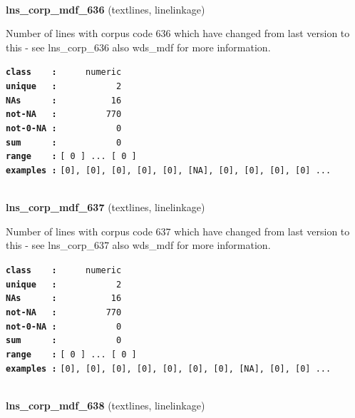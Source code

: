 \documentclass[]{article}
\begin{document}
~

\textbf{lns\_corp\_mdf\_636} (textlines, linelinkage)

Number of lines with corpus code 636 which have changed from last
version to this - see lns\_corp\_636 also wds\_mdf for more information.

\textbf{\texttt{class\ \ \ \ :}} \texttt{~~~~~numeric}\\
\textbf{\texttt{unique\ \ \ :}} \texttt{~~~~~~~~~~~2}\\
\textbf{\texttt{NAs\ \ \ \ \ \ :}} \texttt{~~~~~~~~~~16}\\
\textbf{\texttt{not-NA\ \ \ :}} \texttt{~~~~~~~~~770}\\
\textbf{\texttt{not-0-NA\ :}} \texttt{~~~~~~~~~~~0}\\
\textbf{\texttt{sum\ \ \ \ \ \ :}} \texttt{~~~~~~~~~~~0}\\
\textbf{\texttt{range\ \ \ \ :}}
\texttt{{[}\ 0\ {]}\ ...\ {[}\ 0\ {]}}\\
\textbf{\texttt{examples\ :}}
\texttt{{[}0{]},\ {[}0{]},\ {[}0{]},\ {[}0{]},\ {[}0{]},\ {[}NA{]},\ {[}0{]},\ {[}0{]},\ {[}0{]},\ {[}0{]}\ ...}\\

~

\textbf{lns\_corp\_mdf\_637} (textlines, linelinkage)

Number of lines with corpus code 637 which have changed from last
version to this - see lns\_corp\_637 also wds\_mdf for more information.

\textbf{\texttt{class\ \ \ \ :}} \texttt{~~~~~numeric}\\
\textbf{\texttt{unique\ \ \ :}} \texttt{~~~~~~~~~~~2}\\
\textbf{\texttt{NAs\ \ \ \ \ \ :}} \texttt{~~~~~~~~~~16}\\
\textbf{\texttt{not-NA\ \ \ :}} \texttt{~~~~~~~~~770}\\
\textbf{\texttt{not-0-NA\ :}} \texttt{~~~~~~~~~~~0}\\
\textbf{\texttt{sum\ \ \ \ \ \ :}} \texttt{~~~~~~~~~~~0}\\
\textbf{\texttt{range\ \ \ \ :}}
\texttt{{[}\ 0\ {]}\ ...\ {[}\ 0\ {]}}\\
\textbf{\texttt{examples\ :}}
\texttt{{[}0{]},\ {[}0{]},\ {[}0{]},\ {[}0{]},\ {[}0{]},\ {[}0{]},\ {[}0{]},\ {[}NA{]},\ {[}0{]},\ {[}0{]}\ ...}\\

~

\textbf{lns\_corp\_mdf\_638} (textlines, linelinkage)
\end{document}
